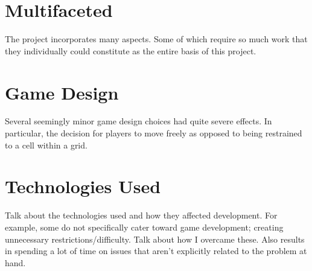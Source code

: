 \documentclass{standalone}
\begin{document}
	\section{Multifaceted}
		The project incorporates many aspects. Some of which require so much work that they individually could constitute as the entire basis of this project.

	\section{Game Design}
		Several seemingly minor game design choices had quite severe effects. In particular, the decision for players to move freely as opposed to being restrained to a cell within a grid.

	\section{Technologies Used}
		Talk about the technologies used and how they affected development. For example, some do not specifically cater toward game development; creating unnecessary restrictions/difficulty. Talk about how I overcame these. Also results in spending a lot of time on issues that aren't explicitly related to the problem at hand. 
\end{document}
